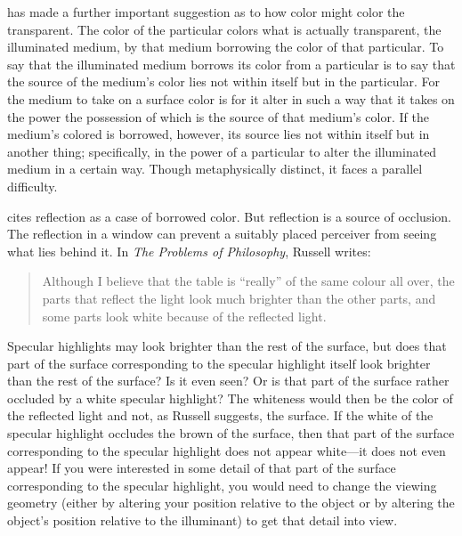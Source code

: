 \citet{Sorabji:2004fk} has made a further important suggestion as to how color might color the transparent. The color of the particular colors what is actually transparent, the illuminated medium, by that medium borrowing the color of that particular. To say that the illuminated medium borrows its color from a particular is to say that the source of the medium's color lies not within itself but in the particular. For the medium to take on a surface color is for it alter in such a way that it takes on the power the possession of which is the source of that medium's color. If the medium's colored is borrowed, however, its source lies not within itself but in another thing; specifically, in the power of a particular to alter the illuminated medium in a certain way. Though metaphysically distinct, it faces a parallel difficulty.

\citet{Sorabji:2004fk} cites reflection as a case of borrowed color. But reflection is a source of occlusion. The reflection in a window can prevent a suitably placed perceiver from seeing what lies behind it. In \emph{The Problems of Philosophy}, Russell writes:
	\begin{quote}
		Although I believe that the table is ``really'' of the same colour all over, the parts that reflect the light look much brighter than the other parts, and some parts look white because of the reflected light. \citep[2]{Russell:1912uq}
	\end{quote}
Specular highlights may look brighter than the rest of the surface, but does that part of the surface corresponding to the specular highlight itself look brighter than the rest of the surface? Is it even seen? Or is that part of the surface rather occluded by a white specular highlight? The whiteness would then be the color of the reflected light and not, as Russell suggests, the surface. If the white of the specular highlight occludes the brown of the surface, then that part of the surface corresponding to the specular highlight does not appear white---it does not even appear! If you were interested in some detail of that part of the surface corresponding to the specular highlight, you would need to change the viewing geometry (either by altering your position relative to the object or by altering the object's position relative to the illuminant) to get that detail into view.

